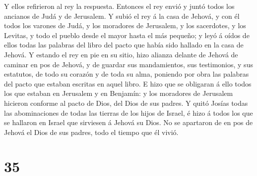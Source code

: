 Y ellos refirieron al rey la respuesta.  Entonces el rey
envió y juntó todos los ancianos de Judá y de Jerusalem. 
Y subió el rey á la casa de Jehová, y con él todos los varones de Judá,
y los moradores de Jerusalem, y los sacerdotes, y los Levitas, y todo el
pueblo desde el mayor hasta el más pequeño; y leyó á oídos de ellos
todas las palabras del libro del pacto que había sido hallado en la casa
de Jehová.  Y estando el rey en pie en su sitio, hizo
alianza delante de Jehová de caminar en pos de Jehová, y de guardar sus
mandamientos, sus testimonios, y sus estatutos, de todo su corazón y de
toda su alma, poniendo por obra las palabras del pacto que estaban
escritas en aquel libro.  E hizo que se obligaran á ello
todos los que estaban en Jerusalem y en Benjamín: y los moradores de
Jerusalem hicieron conforme al pacto de Dios, del Dios de sus padres.
 Y quitó Josías todas las abominaciones de todas las
tierras de los hijos de Israel, é hizo á todos los que se hallaron en
Israel que sirviesen á Jehová su Dios. No se apartaron de en pos de
Jehová el Dios de sus padres, todo el tiempo que él vivió.

\hypertarget{section-34}{%
\section{35}\label{section-34}}

